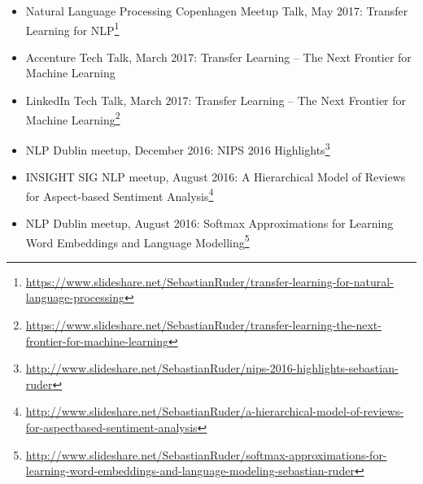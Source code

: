 \documentclass[10pt,letterpaper]{article}
\begin{document}
\begin{itemize}
	\parskip=0.1em
	
	\item Natural Language Processing Copenhagen Meetup Talk, May 2017: Transfer Learning for NLP\footnote{\url{https://www.slideshare.net/SebastianRuder/transfer-learning-for-natural-language-processing}}
	
	\item Accenture Tech Talk, March 2017: Transfer Learning -- The Next Frontier for Machine Learning
	
	\item LinkedIn Tech Talk, March 2017: Transfer Learning -- The Next Frontier for Machine Learning\footnote{\url{https://www.slideshare.net/SebastianRuder/transfer-learning-the-next-frontier-for-machine-learning}}
	
	\item NLP Dublin meetup, December 2016: NIPS 2016 Highlights\footnote{\url{http://www.slideshare.net/SebastianRuder/nips-2016-highlights-sebastian-ruder}}
	
	\item INSIGHT SIG NLP meetup, August 2016: A Hierarchical Model of Reviews for Aspect-based Sentiment Analysis\footnote{\url{http://www.slideshare.net/SebastianRuder/a-hierarchical-model-of-reviews-for-aspectbased-sentiment-analysis}}
	
	\item NLP Dublin meetup, August 2016: Softmax Approximations for Learning Word Embeddings and Language Modelling\footnote{\url{http://www.slideshare.net/SebastianRuder/softmax-approximations-for-learning-word-embeddings-and-language-modeling-sebastian-ruder}}
	
\end{itemize}
\end{document}
